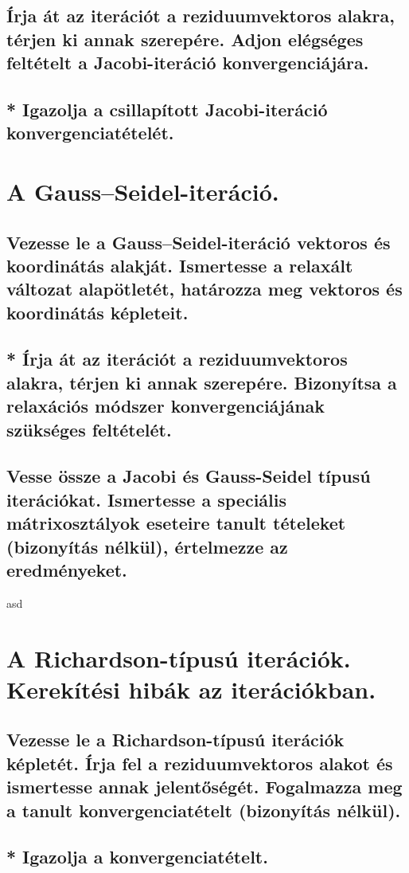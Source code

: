 \documentclass{article}
\begin{document}
        \subsection{Írja át az iterációt a reziduumvektoros alakra, térjen ki annak szerepére. Adjon elégséges feltételt a Jacobi-iteráció konvergenciájára.}
        \subsection{* Igazolja a csillapított Jacobi-iteráció konvergenciatételét.}


    \section{A Gauss–Seidel-iteráció.}
        \subsection{Vezesse le a Gauss–Seidel-iteráció vektoros és koordinátás alakját. Ismertesse a relaxált változat alapötletét, határozza meg vektoros és koordinátás képleteit.}
        \subsection{* Írja át az iterációt a reziduumvektoros alakra, térjen ki annak szerepére. Bizonyítsa a relaxációs módszer konvergenciájának szükséges feltételét.}
        \subsection{Vesse össze a Jacobi és Gauss-Seidel típusú iterációkat. Ismertesse a speciális mátrixosztályok eseteire tanult tételeket (bizonyítás nélkül), értelmezze az eredményeket.}

asd
    \section{A Richardson-típusú iterációk. Kerekítési hibák az iterációkban.}
        \subsection{Vezesse le a Richardson-típusú iterációk képletét. Írja fel a reziduumvektoros alakot és ismertesse annak jelentőségét. Fogalmazza meg a tanult konvergenciatételt (bizonyítás nélkül).}
        \subsection{* Igazolja a konvergenciatételt.}
\end{document}
